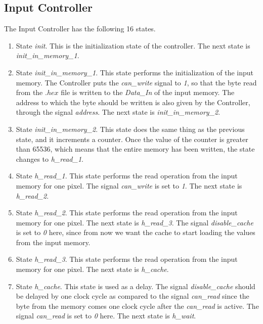 \documentclass[11pt,a4paper]{article}
\begin{document}
\subsection{Input Controller}

The Input Controller has the following 16 states.
\begin{enumerate}
\item State \textit{init}. This is the initialization state of the controller. The next state is \textit{init\_in\_memory\_1}.

\item State \textit{init\_in\_memory\_1}. This state performs the initialization of the input memory. The Controller puts the  \textit{can\_write} signal to \textit{1}, so that the byte read from the $.hex$ file is written to the \textit{Data\_In} of the input memory. The address to which the byte should be written is also given by the Controller, through the signal \textit{address}. The next state is \textit{init\_in\_memory\_2}.

\item State \textit{init\_in\_memory\_2}. This state does the same thing as the previous state, and it increments a counter. Once the value of the counter is greater than 65536, which means that the entire memory has been written, the state changes to \textit{h\_read\_1}.

\item State \textit{h\_read\_1}. This state performs the read operation from the input memory for one pixel. The signal \textit{can\_write} is set to \textit{1}. The next state is \textit{h\_read\_2}.

\item State \textit{h\_read\_2}. This state performs the read operation from the input memory for one pixel. The next state is \textit{h\_read\_3}. The signal \textit{disable\_cache} is set to \textit{0} here, since from now we want the cache to start loading the values from the input memory. 

\item State \textit{h\_read\_3}. This state performs the read operation from the input memory for one pixel. The next state is \textit{h\_cache}.

\item State \textit{h\_cache}. This state is used as a delay. The signal \textit{disable\_cache} should be delayed by one clock cycle as compared to the signal \textit{can\_read} since the byte from the memory comes one clock cycle after the \textit{can\_read} is active. The signal \textit{can\_read} is set to \textit{0} here. The next state is \textit{h\_wait}.


\end{enumerate}
\end{document}
